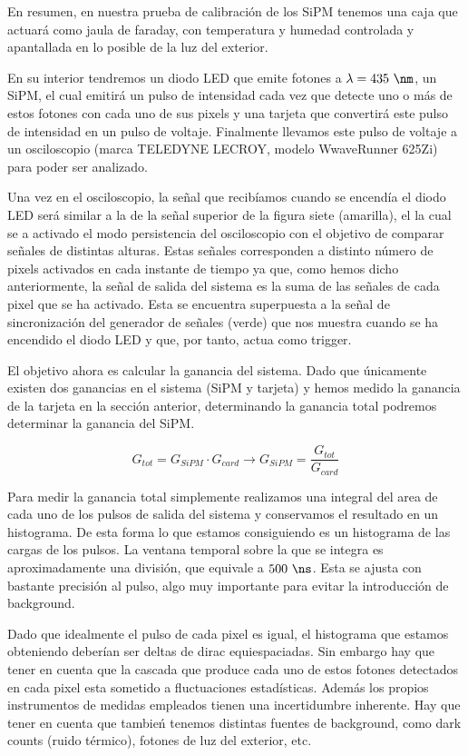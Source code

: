 En resumen, en nuestra prueba de calibración de los SiPM tenemos una caja que actuará como jaula de faraday, con temperatura y humedad controlada y apantallada en lo posible de la luz del exterior. 

En su interior tendremos un diodo LED que emite fotones a $\lambda=435~\nm$, un SiPM, el cual emitirá un pulso de intensidad cada vez que detecte uno o más de estos fotones con cada uno de sus pixels y una tarjeta que convertirá este pulso de intensidad en un pulso de voltaje. Finalmente llevamos este pulso de voltaje a un osciloscopio (marca TELEDYNE LECROY, modelo WwaveRunner 625Zi) para poder ser analizado. 

Una vez en el osciloscopio, la señal que recibíamos cuando se encendía el diodo LED será similar a la de la señal superior de la figura siete (amarilla), el la cual se a activado el modo persistencia del osciloscopio con el objetivo de comparar señales de distintas alturas. Estas señales corresponden a distinto número de pixels activados en cada instante de tiempo ya que, como hemos dicho anteriormente, la señal de salida del sistema es la suma de las señales de cada pixel que se ha activado. Esta se encuentra superpuesta a la señal de sincronización del generador de señales (verde) que nos muestra cuando se ha encendido el diodo LED y que, por tanto, actua como trigger.

El objetivo ahora es calcular la ganancia del sistema. Dado que únicamente existen dos ganancias en el sistema (SiPM y tarjeta) y hemos medido la ganancia de la tarjeta en la sección anterior, determinando la ganancia total podremos determinar la ganancia del SiPM. 

\begin{equation}
G_{tot}=G_{SiPM} \cdotp G_{card} \longrightarrow G_{SiPM} = \frac{G_{tot}}{G_{card}}
\label{ganancias}
\end{equation}

Para medir la ganancia total simplemente realizamos una integral del area de cada uno de los pulsos de salida del sistema y conservamos el resultado en un histograma. De esta forma lo que estamos consiguiendo es un histograma de las cargas de los pulsos. La ventana temporal sobre la que se integra es aproximadamente una división, que equivale a $500~\ns$. Esta se ajusta con bastante precisión al pulso, algo muy importante para evitar la introducción de background.

Dado que idealmente el pulso de cada pixel es igual, el histograma que estamos obteniendo deberían ser deltas de dirac equiespaciadas. Sin embargo hay que tener en cuenta que la cascada que produce cada uno de estos fotones detectados en cada pixel esta sometido a fluctuaciones estadísticas. Además los propios instrumentos de medidas empleados tienen una incertidumbre inherente. Hay que tener en cuenta que tambień tenemos distintas fuentes de background, como dark counts (ruido térmico), fotones de luz del exterior, etc. 

